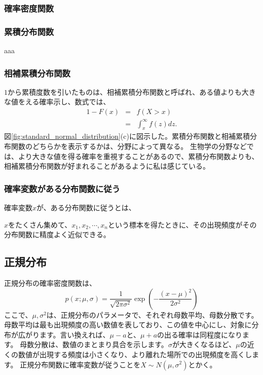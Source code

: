 \documentclass[a4paper,11pt,dvipdfmx]{jsarticle}
\begin{document}
\subsubsection{確率密度関数}

\subsubsection{累積分布関数}
aaa

\subsubsection{相補累積分布関数}
$1$から累積度数を引いたものは、相補累積分布関数と呼ばれ、ある値よりも大きな値をえる確率示し、数式では、
\begin{eqnarray}
    1-F(x) &=& f(X>x) \\
        &=& \int_{x}^{\infty} f(z)dz.
\end{eqnarray}
図\ref{fig:standard_normal_distribution}(c)に図示した。累積分布関数と相補累積分布関数のどちらかを表示するかは、分野によって異なる。
生物学の分野などでは、より大きな値を得る確率を重視することがあるので、累積分布関数よりも、相補累積分布関数が好まれることがあるように私は感じている。

\subsubsection{確率変数がある分布関数に従う}
確率変数$x$が、ある分布関数に従うとは、

$x$をたくさん集めて、$x_1,x_2,\cdots,x_n$という標本を得たときに、その出現頻度がその分布関数に精度よく近似できる。


\subsection{正規分布}
正規分布の確率密度関数は、
\begin{equation}
p(x;\mu,\sigma)=\frac{1}{\sqrt{2\pi\sigma^2}}\exp\left(-\frac{(x-\mu)^2}{2\sigma^2} \right)
\end{equation}
ここで、$\mu,\sigma^2$は、正規分布のパラメータで、それぞれ母数平均、母数分散です。
母数平均は最も出現頻度の高い数値を表しており、この値を中心にし、対象に分布が広がります。言い換えれば、$\mu-a$と、$\mu+a$の出る確率は同程度になります。
母数分散は、数値のまとまり具合を示します。$\sigma$が大きくなるほど、$\mu$の近くの数値が出現する頻度は小さくなり、より離れた場所での出現頻度を高くします。
正規分布関数に確率変数が従うことを$X\sim N(\mu,\sigma^2)$とかく。
\end{document}
